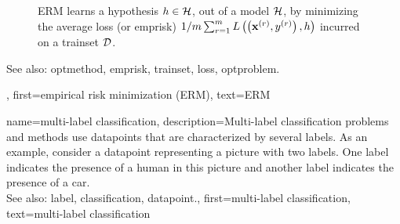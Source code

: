 {{\begin{figure}[H]
\begin{center}
			\caption{ERM learns a \gls{hypothesis} $h\in \mathcal{H}$, out of a \gls{model} $\mathcal{H}$, 
				by minimizing the average \gls{loss} (or \gls{emprisk}) 
				${1}/{m} \sum_{r=1}^m L\left(\left( {\bf x}^{(r)}, y^{(r)} \right),h \right)$ 
				incurred on a \gls{trainset} $\mathcal{D}$. \label{fig_erm_dict} }
			\end{center}
		\end{figure} 
		See also: \gls{optmethod}, \gls{emprisk}, \gls{trainset}, \gls{loss}, \gls{optproblem}.},
	first={empirical risk minimization (ERM)},
	text={ERM} 
}


{name={multi-label classification}, 
	description={Multi-\gls{label} 
		\gls{classification} problems and methods use \glspl{datapoint} 
		that are characterized by several \glspl{label}. As an example, consider a \gls{datapoint} 
		representing a picture with two \glspl{label}. One \gls{label} indicates the presence of a human 
		in this picture and another \gls{label} indicates the presence of a car.
				\\
		See also: \gls{label}, \gls{classification}, \gls{datapoint}.},
	    first={multi-label classification},
	    text={multi-label classification} 
}

